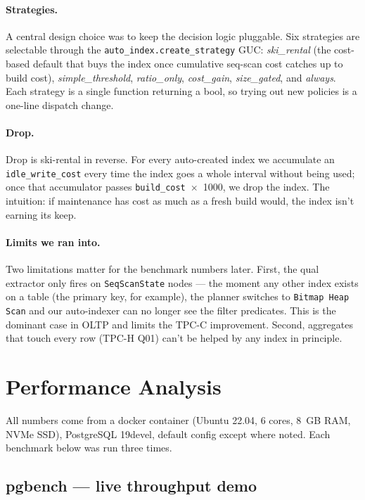\documentclass[10pt,a4paper]{article}
\newcommand{\code}[1]{\texttt{\small #1}}
\begin{document}
\paragraph{Strategies.} A central design choice was to keep the
decision logic pluggable. Six strategies are selectable through the
\code{auto\_index.create\_strategy} GUC: \emph{ski\_rental} (the
cost-based default that buys the index once cumulative seq-scan cost
catches up to build cost), \emph{simple\_threshold},
\emph{ratio\_only}, \emph{cost\_gain}, \emph{size\_gated}, and
\emph{always}. Each strategy is a single function returning a bool,
so trying out new policies is a one-line dispatch change.

\paragraph{Drop.} Drop is ski-rental in reverse. For every
auto-created index we accumulate an \code{idle\_write\_cost} every
time the index goes a whole interval without being used; once that
accumulator passes \code{build\_cost}~$\times$~1000, we drop the
index. The intuition: if maintenance has cost as much as a fresh
build would, the index isn't earning its keep.

\paragraph{Limits we ran into.} Two limitations matter for the
benchmark numbers later. First, the qual extractor only fires on
\code{SeqScanState} nodes --- the moment any other index exists on
a table (the primary key, for example), the planner switches to
\code{Bitmap Heap Scan} and our auto-indexer can no longer see the
filter predicates. This is the dominant case in OLTP and limits the
TPC-C improvement. Second, aggregates that touch every row (TPC-H
Q01) can't be helped by any index in principle.

\section{Performance Analysis}

All numbers come from a docker container (Ubuntu 22.04, 6 cores,
8~GB RAM, NVMe SSD), PostgreSQL 19devel, default config except where
noted. Each benchmark below was run three times.

\subsection*{pgbench --- live throughput demo}
\end{document}
